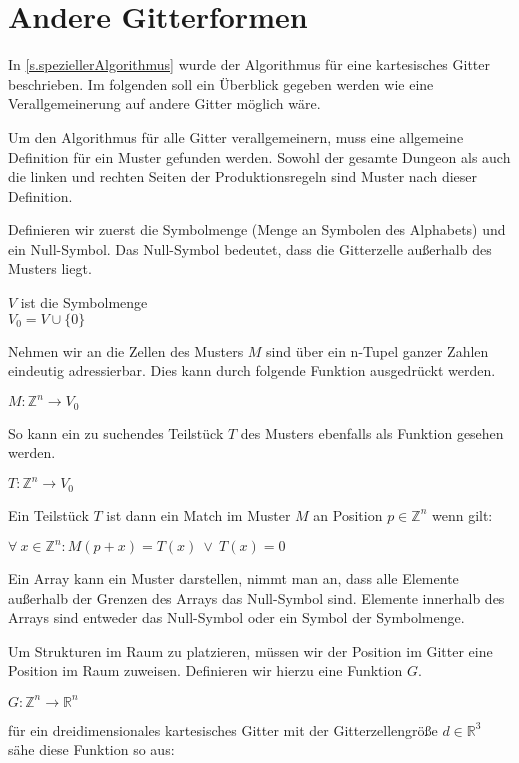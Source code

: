 
\section{Andere Gitterformen}\label{s.allgemeinerAlgorithmus}

In \ref{s.speziellerAlgorithmus} wurde der Algorithmus für eine kartesisches Gitter beschrieben. Im folgenden soll ein Überblick gegeben werden wie eine Verallgemeinerung auf andere Gitter möglich wäre.

Um den Algorithmus für alle Gitter verallgemeinern, muss eine allgemeine Definition für ein Muster gefunden werden. Sowohl der gesamte Dungeon als auch die linken und rechten Seiten der Produktionsregeln sind Muster nach dieser Definition. 

Definieren wir zuerst die Symbolmenge (Menge an Symbolen des Alphabets) und ein Null-Symbol. Das Null-Symbol bedeutet, dass die Gitterzelle außerhalb des Musters liegt. 

$ V $ ist die Symbolmenge \\
$ V_0 = V \cup \{0\} $ 

Nehmen wir an die Zellen des Musters $ M $ sind über ein n-Tupel ganzer Zahlen eindeutig adressierbar. Dies kann durch folgende Funktion ausgedrückt werden.

$ M: \mathbb{Z}^n \rightarrow V_0 $

So kann ein zu suchendes Teilstück $ T $ des Musters ebenfalls als Funktion gesehen werden.

$ T: \mathbb{Z}^n \rightarrow V_0 $

Ein Teilstück $ T $ ist dann ein Match im Muster $ M $ an Position $ p \in \mathbb{Z}^n $ wenn gilt:

$ \forall \  x \in \mathbb{Z}^n: M(p + x) = T(x) \ \lor \  T(x) = 0 $

Ein Array kann ein Muster darstellen, nimmt man an, dass alle Elemente außerhalb der Grenzen des Arrays das Null-Symbol sind. Elemente innerhalb des Arrays sind entweder das Null-Symbol oder ein Symbol der Symbolmenge.

Um Strukturen im Raum zu platzieren, müssen wir der Position im Gitter eine Position im Raum zuweisen. Definieren wir hierzu eine Funktion $ G $.

$ G: \mathbb{Z}^n \rightarrow \mathbb{R}^n $

für ein dreidimensionales kartesisches Gitter mit der Gitterzellengröße $ d \in \mathbb{R}^3 $ sähe diese Funktion so aus:

